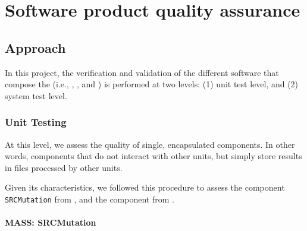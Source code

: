 
\chapter{Software product quality assurance}

%

\section{Approach}

In this project, the verification and validation of the different software that compose the \FAQAS (i.e., \MASS, \SEMUS, and \DAMA) is performed at two levels: (1) unit test level, and (2) system test level.

\subsection{Unit Testing}

At this level, we assess the quality of single, encapsulated components. In other words, components that do not interact with other units, but simply store results in files processed by other units.

Given its characteristics, we followed this procedure to assess the component \texttt{SRCMutation} from \MASS, and the component \texttt{} from \DAMA.

\subsubsection{MASS: SRCMutation}


